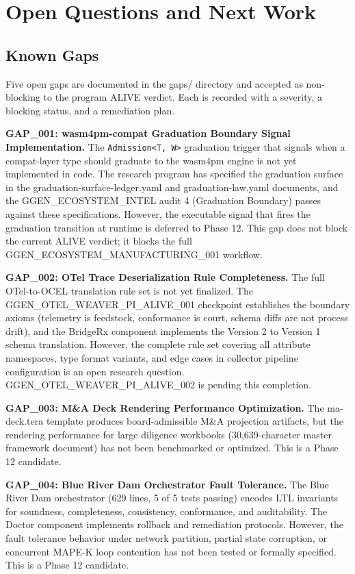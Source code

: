 \section{Open Questions and Next Work}
\label{sec:checkpoints-open-questions}

\subsection{Known Gaps}
\label{sec:checkpoints-open-questions-gaps}

Five open gaps are documented in the gaps/ directory and accepted as non-blocking to the program
ALIVE verdict. Each is recorded with a severity, a blocking status, and a remediation plan.

\textbf{GAP\_001: wasm4pm-compat Graduation Boundary Signal Implementation.} The
\texttt{Admission<T, W>} graduation trigger that signals when a compat-layer type should graduate
to the wasm4pm engine is not yet implemented in code. The research program has specified the
graduation surface in the graduation-surface-ledger.yaml and graduation-law.yaml documents, and the
GGEN\_ECOSYSTEM\_INTEL audit 4 (Graduation Boundary) passes against these specifications. However,
the executable signal that fires the graduation transition at runtime is deferred to Phase 12. This
gap does not block the current ALIVE verdict; it blocks the full GGEN\_ECOSYSTEM\_MANUFACTURING\_001
workflow.

\textbf{GAP\_002: OTel Trace Deserialization Rule Completeness.} The full OTel-to-OCEL translation
rule set is not yet finalized. The GGEN\_OTEL\_WEAVER\_PI\_ALIVE\_001 checkpoint establishes the
boundary axioms (telemetry is feedstock, conformance is court, schema diffs are not process drift),
and the BridgeRx component implements the Version 2 to Version 1 schema translation. However, the
complete rule set covering all attribute namespaces, type format variants, and edge cases in
collector pipeline configuration is an open research question. GGEN\_OTEL\_WEAVER\_PI\_ALIVE\_002
is pending this completion.

\textbf{GAP\_003: M\&A Deck Rendering Performance Optimization.} The ma-deck.tera template produces
board-admissible M\&A projection artifacts, but the rendering performance for large diligence
workbooks (30,639-character master framework document) has not been benchmarked or optimized.
This is a Phase 12 candidate.

\textbf{GAP\_004: Blue River Dam Orchestrator Fault Tolerance.} The Blue River Dam orchestrator
(629 lines, 5 of 5 tests passing) encodes LTL invariants for soundness, completeness, consistency,
conformance, and auditability. The Doctor component implements rollback and remediation protocols.
However, the fault tolerance behavior under network partition, partial state corruption, or
concurrent MAPE-K loop contention has not been tested or formally specified. This is a Phase 12
candidate.

